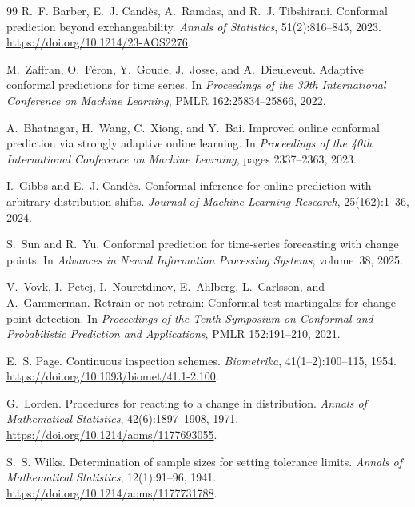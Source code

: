 \documentclass[10pt]{article}
\begin{document}
\begin{thebibliography}{99}
R.~F. Barber, E.~J. Cand\`es, A.~Ramdas, and R.~J. Tibshirani.
\newblock Conformal prediction beyond exchangeability.
\newblock \emph{Annals of Statistics}, 51(2):816--845, 2023. \url{https://doi.org/10.1214/23-AOS2276}.

M.~Zaffran, O.~F\'eron, Y.~Goude, J.~Josse, and A.~Dieuleveut.
\newblock Adaptive conformal predictions for time series.
\newblock In \emph{Proceedings of the 39th International Conference on Machine Learning}, PMLR 162:25834--25866, 2022.

A.~Bhatnagar, H.~Wang, C.~Xiong, and Y.~Bai.
\newblock Improved online conformal prediction via strongly adaptive online learning.
\newblock In \emph{Proceedings of the 40th International Conference on Machine Learning}, pages 2337--2363, 2023.

I.~Gibbs and E.~J. Cand\`es.
\newblock Conformal inference for online prediction with arbitrary distribution shifts.
\newblock \emph{Journal of Machine Learning Research}, 25(162):1--36, 2024.

S.~Sun and R.~Yu.
\newblock Conformal prediction for time-series forecasting with change points.
\newblock In \emph{Advances in Neural Information Processing Systems}, volume~38, 2025.

V.~Vovk, I.~Petej, I.~Nouretdinov, E.~Ahlberg, L.~Carlsson, and A.~Gammerman.
\newblock Retrain or not retrain: Conformal test martingales for change-point detection.
\newblock In \emph{Proceedings of the Tenth Symposium on Conformal and Probabilistic Prediction and Applications}, PMLR 152:191--210, 2021.

E.~S. Page.
\newblock Continuous inspection schemes.
\newblock \emph{Biometrika}, 41(1--2):100--115, 1954. \url{https://doi.org/10.1093/biomet/41.1-2.100}.

G.~Lorden.
\newblock Procedures for reacting to a change in distribution.
\newblock \emph{Annals of Mathematical Statistics}, 42(6):1897--1908, 1971. \url{https://doi.org/10.1214/aoms/1177693055}.

S.~S. Wilks.
\newblock Determination of sample sizes for setting tolerance limits.
\newblock \emph{Annals of Mathematical Statistics}, 12(1):91--96, 1941. \url{https://doi.org/10.1214/aoms/1177731788}.

\end{thebibliography}
\end{document}
